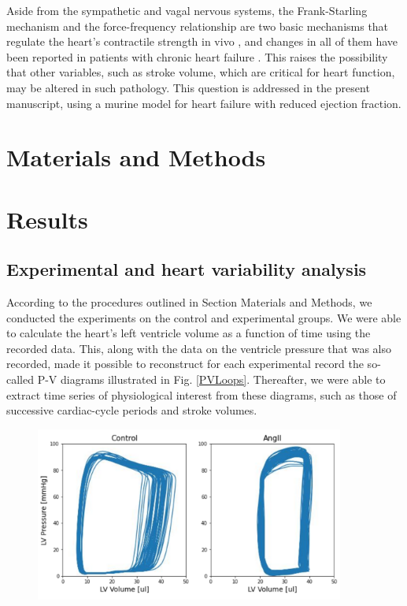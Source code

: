\documentclass[%
preprint,
 amsmath,amssymb,
 aps,
]{revtex4-2}
\begin{document}
Aside from the sympathetic and vagal nervous systems, the Frank-Starling mechanism and the force-frequency relationship are two basic mechanisms that regulate the heart's contractile strength in vivo \citep{Holubarsch_1996} , and changes in all of them have been reported in patients with chronic heart failure \citep{Mulieri_1992, Pieske_1992, Bristow_1982, Bristow_1989, Holubarsch_1996}. This raises the possibility that other variables, such as stroke volume, which are critical for heart function, may be altered in such pathology. This question is addressed in the present manuscript, using a murine model for heart failure with reduced ejection fraction.

\section{\label{sec:meth}Materials and Methods}

\section{\label{sec:res}Results}

\subsection{\label{sec:conclu}Experimental and heart variability analysis}

According to the procedures outlined in Section Materials and Methods, we conducted the experiments on the control and experimental groups. We were able to calculate the heart's left ventricle volume as a function of time using the recorded data. This, along with the data on the ventricle pressure that was also recorded, made it possible to reconstruct for each experimental record the so-called P-V diagrams illustrated in Fig. \ref{PVLoops}. Thereafter, we were able to extract time series of physiological interest from these diagrams, such as those of successive cardiac-cycle periods and stroke volumes.

\begin{figure}[h!]
    \includegraphics[width=4in]{PV_Loops.pdf}
    \caption{}
    \label{fig:PVLoops}
\end{figure}
\end{document}

